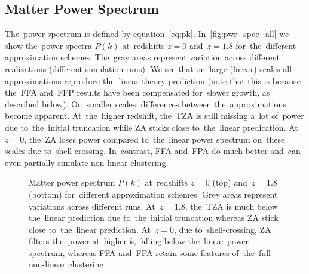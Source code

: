 \subsection{Matter Power Spectrum}
\label{sec:pwr_spec}
The~power spectrum is defined by equation~\eqref{eq:pk}. In~\autoref{fig:pwr_spec_all} we show the~power spectra $P(k)$ at~redshifts $z=0$ and~$z=1.8$ for~the~different approximation schemes. The~gray areas represent variation across different realizations (different simulation runs). We see that on~large (linear) scales all approximations reproduce the~linear theory prediction (note that this is because the~FFA and~FFP results have been compensated for~slower growth, as described below). On~smaller scales, differences between the~approximations become apparent. At~the~higher redshift, the~TZA is still missing a~lot of~power due to~the~initial truncation while ZA sticks close to~the~linear predication. At~$z=0$, the~ZA loses power compared to~the~linear power spectrum on~these scales due to~shell-crossing. In~contrast, FFA and~FPA do much better and~can even partially simulate non-linear clustering.

\begin{figure}[!hbt]
\centering
	\begin{subfigure}{0.9\textwidth}
	\end{subfigure}
	\begin{subfigure}{0.9\textwidth}
	\end{subfigure}
	\begin{subfigure}{0.9\textwidth}
	\end{subfigure}%
	\caption{Matter power spectrum $P(k)$ at~redshifts $z=0$ (top) and~$z=1.8$ (bottom) for~different approximation schemes. Grey areas represent variations across different runs. At~$z=1.8$, the~TZA is much below the~linear prediction due to~the~initial truncation whereas ZA stick close to~the~linear prediction. At~$z=0$, due to~shell-crossing, ZA filters the~power at~higher $k$, falling below the~linear power spectrum, whereas FFA and~FPA retain some features of~the~full non-linear clustering.}
    \label{fig:pwr_spec_all}
\end{figure}

